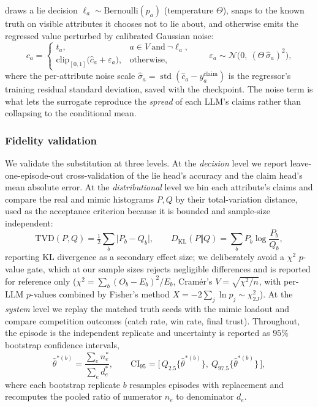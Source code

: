 draws a lie decision $\ell_a \sim \mathrm{Bernoulli}(p_a)$ (temperature $\Theta$),
snaps to the known truth on visible attributes it chooses not to lie about, and
otherwise emits the regressed value perturbed by calibrated Gaussian noise:
\begin{equation}
c_a =
\begin{cases}
t_a, & a \in V \ \text{and}\ \neg \ell_a,\\[2pt]
\mathrm{clip}_{[0,1]}\!\bigl(\hat{c}_a + \varepsilon_a\bigr), & \text{otherwise,}
\end{cases}
\qquad
\varepsilon_a \sim \mathcal{N}\!\bigl(0,\ (\Theta\,\hat{\sigma}_a)^2\bigr),
\label{eq:dec-infer}
\end{equation}
where the per-attribute noise scale $\hat{\sigma}_a = \operatorname{std}(\hat{c}_a - y^{\mathrm{claim}}_a)$
is the regressor's training residual standard deviation, saved with the
checkpoint. The noise term is what lets the surrogate reproduce the
\emph{spread} of each LLM's claims rather than collapsing to the conditional
mean.

\subsubsection{Fidelity validation}
\label{sec:dec-fidelity}
We validate the substitution at three levels. At the \emph{decision} level we
report leave-one-episode-out cross-validation of the lie head's accuracy and the
claim head's mean absolute error. At the \emph{distributional} level we bin each
attribute's claims and compare the real and mimic histograms $P,Q$ by their
total-variation distance, used as the acceptance criterion because it is bounded
and sample-size independent:
\begin{equation}
\mathrm{TVD}(P,Q) = \tfrac12 \sum_b \lvert P_b - Q_b \rvert,
\qquad
D_{\mathrm{KL}}(P \Vert Q) = \sum_b P_b \log\frac{P_b}{Q_b},
\label{eq:dec-tvd}
\end{equation}
reporting KL divergence as a secondary effect size; we deliberately avoid a
$\chi^2$ $p$-value gate, which at our sample sizes rejects negligible
differences and is reported for reference only ($\chi^2 = \sum_b (O_b-E_b)^2/E_b$,
Cram\'er's $V = \sqrt{\chi^2/n}$, with per-LLM $p$-values combined by Fisher's
method $X = -2\sum_j \ln p_j \sim \chi^2_{2J}$). At the \emph{system} level we
replay the matched truth seeds with the mimic loadout and compare competition
outcomes (catch rate, win rate, final trust). Throughout, the episode is the
independent replicate and uncertainty is reported as $95\%$ bootstrap
confidence intervals,
\begin{equation}
\widehat{\theta}^{*(b)} = \frac{\sum_{e} n^{*}_{e}}{\sum_{e} d^{*}_{e}},
\qquad
\mathrm{CI}_{95} = \bigl[\,Q_{2.5}\{\widehat{\theta}^{*(b)}\},\ Q_{97.5}\{\widehat{\theta}^{*(b)}\}\,\bigr],
\label{eq:dec-bootstrap}
\end{equation}
where each bootstrap replicate $b$ resamples episodes with replacement and
recomputes the pooled ratio of numerator $n_e$ to denominator $d_e$.
